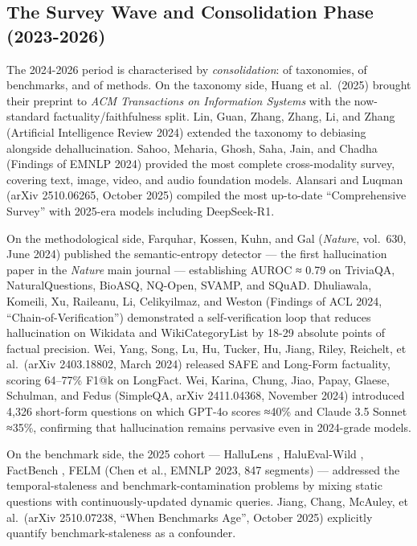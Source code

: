 \documentclass{article}
\begin{document}
\subsection{The Survey Wave and Consolidation Phase (2023-2026)}\label{the-survey-wave-and-consolidation-phase-2023-2026}

The 2024-2026 period is characterised by \emph{consolidation}: of taxonomies, of benchmarks, and of methods. On the taxonomy side, Huang et al.~(2025) brought their preprint to \emph{ACM Transactions on Information Systems} with the now-standard factuality/faithfulness split. Lin, Guan, Zhang, Zhang, Li, and Zhang (Artificial Intelligence Review 2024) extended the taxonomy to debiasing alongside dehallucination. Sahoo, Meharia, Ghosh, Saha, Jain, and Chadha (Findings of EMNLP 2024) provided the most complete cross-modality survey, covering text, image, video, and audio foundation models. Alansari and Luqman (arXiv 2510.06265, October 2025) compiled the most up-to-date ``Comprehensive Survey'' with 2025-era models including DeepSeek-R1.

On the methodological side, Farquhar, Kossen, Kuhn, and Gal (\emph{Nature}, vol.~630, June 2024) published the semantic-entropy detector --- the first hallucination paper in the \emph{Nature} main journal --- establishing AUROC ≈ 0.79 on TriviaQA, NaturalQuestions, BioASQ, NQ-Open, SVAMP, and SQuAD. Dhuliawala, Komeili, Xu, Raileanu, Li, Celikyilmaz, and Weston (Findings of ACL 2024, ``Chain-of-Verification'') demonstrated a self-verification loop that reduces hallucination on Wikidata and WikiCategoryList by 18-29 absolute points of factual precision. Wei, Yang, Song, Lu, Hu, Tucker, Hu, Jiang, Riley, Reichelt, et al.~(arXiv 2403.18802, March 2024) released SAFE and Long-Form factuality, scoring 64--77\% F1@k on LongFact. Wei, Karina, Chung, Jiao, Papay, Glaese, Schulman, and Fedus (SimpleQA, arXiv 2411.04368, November 2024) introduced 4,326 short-form questions on which GPT-4o scores ≈40\% and Claude 3.5 Sonnet ≈35\%, confirming that hallucination remains pervasive even in 2024-grade models.

On the benchmark side, the 2025 cohort --- HalluLens \citep{bang2025hallulensllmhalluc}, HaluEval-Wild \citep{zhu2024haluevalwildevalua}, FactBench \citep{bayat2024factbenchadynamicb}, FELM (Chen et al., EMNLP 2023, 847 segments) --- addressed the temporal-staleness and benchmark-contamination problems by mixing static questions with continuously-updated dynamic queries. Jiang, Chang, McAuley, et al.~(arXiv 2510.07238, ``When Benchmarks Age'', October 2025) explicitly quantify benchmark-staleness as a confounder.
\end{document}
